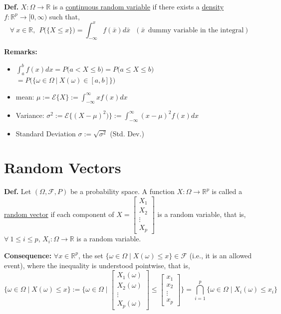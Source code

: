 \documentclass[letterpaper]{article}
\newcommand{\real}{\mathbb R}  %
\newcommand{\E}{\mathcal{E}}
\begin{document}
 \textbf{Def.}   $X: \Omega \rightarrow \real$ is a \ul{continuous random variable} if there exists a \ul{density} $f:\real^p \to [0, \infty)$ such that,
 $$\forall~x\in \real,~~P\big(\{ X \le x\} \big)= \int_{-\infty}^{x} f(\bar{x}) d\bar{x}~~~(\bar{x}~~\text{dummy variable in the integral})$$



  \textbf{Remarks:}
  \begin{itemize}
 \item $\int_{a}^{b} f(x) dx=P\big( a < X \le b \big)=P\big( a \le X \le b \big)  $ \medskip \newline
 \hspace*{2cm}~$=P\big(\{\omega \in \Omega~|~ X(\omega) \in [a, b]\} \big)$

     \item mean: $\mu:=\E \{ X\}:= \int_{-\infty}^{\infty} x f(x) dx$

     \item Variance: $\sigma^2:=\E \{ (X-\mu)^2)\}:= \int_{-\infty}^{\infty} (x-\mu)^2f(x) dx$

     \item Standard Deviation $\sigma :=\sqrt{\sigma^2}$ (Std. Dev.)
     \end{itemize}

     \newpage

    \section{Random Vectors}
        \noindent
        \textbf{Def.} Let $(\Omega, \mathscr{F}, P)$ be a probability space. A function $X: \Omega \rightarrow \real^p$ is called a \ul{random vector} if each component of $X=\left[ \begin{array}{ccc}
        X_1\\X_2\\\vdots\\X_p\end{array} \right]$ is a random variable, that is, $\forall~ 1 \le i \le p$, $X_i: \Omega \rightarrow \real$   is a random variable.\\

        \setlength{\parskip}{.4in}

        \noindent
        \textbf{Consequence:} $\forall x \in \real^p $, the set $\{\omega \in \Omega \mid X(\omega) \le x\} \in \mathscr{F}$ (i.e., it is an allowed event), where the inequality is understood pointwise, that is,
        $$\{\omega \in \Omega \mid X(\omega) \le x \}:= \{\omega \in \Omega \mid \begin{bmatrix}X_1(\omega) \\X_2(\omega) \\ \vdots \\ X_p(\omega) \end{bmatrix} \le \begin{bmatrix} x_1 \\x_2 \\ \vdots \\ x_p \end{bmatrix} \} = \bigcap\limits^p_{i=1} \{\omega \in \Omega \mid X_i(\omega) \le x_i\}$$
\end{document}
